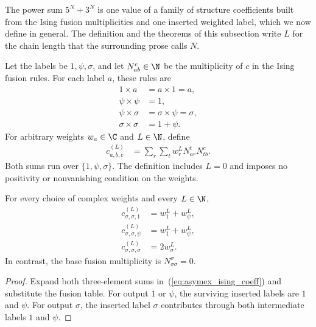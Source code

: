 The power sum $5^N+3^N$ is one value of a family of structure
coefficients built from the Ising fusion multiplicities and one
inserted weighted label, which we now define in general. The
definition and the theorems of this subsection write $L$ for the
chain length that the surrounding prose calls $N$.

\begin{definition}
    \label{def:asymex_ising_coefficients}
    \leanok
    Let the labels be $1,\psi,\sigma$, and let $N_{ab}^{c}\in\N$
    be the multiplicity of $c$ in the Ising fusion rules. For each
    label $a$, these rules are
    \begin{align}
        1\times a          & =a\times 1=a,             \\
        \psi\times\psi     & =1,                       \\
        \psi\times\sigma   & =\sigma\times\psi=\sigma, \\
        \sigma\times\sigma & =1+\psi.
    \end{align}
    For arbitrary weights $w_a\in\C$ and $L\in\N$, define
    \begin{align}
        c_{a,b,c}^{(L)}
         & =\sum_r\sum_t w_r^L N_{ar}^{t}N_{tb}^{c}.
        \label{eq:asymex_ising_coeff}
    \end{align}
    Both sums run over $\{1,\psi,\sigma\}$.
    The definition includes $L=0$ and imposes no positivity or
    nonvanishing condition on the weights.
\end{definition}

\begin{lemma}
    \label{thm:asymex_ising_sigma}
    \leanok
    For every choice of complex weights and every $L\in\N$,
    \begin{align}
        c_{\sigma,\sigma,1}^{(L)}      & =w_1^L+w_\psi^L, \\
        c_{\sigma,\sigma,\psi}^{(L)}   & =w_1^L+w_\psi^L, \\
        c_{\sigma,\sigma,\sigma}^{(L)} & =2w_\sigma^L.
    \end{align}
    In contrast, the base fusion multiplicity is
    $N_{\sigma\sigma}^{\sigma}=0$.
\end{lemma}
\begin{proof}
    \leanok
    Expand both three-element sums in~(\ref{eq:asymex_ising_coeff})
    and substitute the fusion table. For output $1$ or $\psi$, the
    surviving inserted labels are $1$ and $\psi$. For output $\sigma$,
    the inserted label $\sigma$ contributes through both intermediate
    labels $1$ and $\psi$.
\end{proof}

